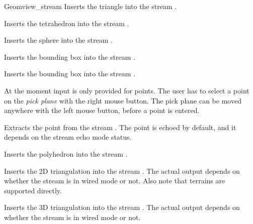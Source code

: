 \begin{ccClass}{Geomview_stream}
{Inserts the triangle  into the stream \ccVar.}


{Inserts the tetrahedron  into the stream \ccVar.}

{Inserts the sphere  into the stream \ccVar.}


{Inserts the bounding box  into the stream \ccVar.}

{Inserts the bounding box  into the stream \ccVar.}



At the moment input is only provided for points. The user has to select
a point on the {\it pick plane} with the right mouse button. The pick plane
can be moved anywhere with the left mouse button, before a point is entered.

{Extracts the point  from the stream \ccVar. The point is
 echoed by default, and it depends on the stream echo mode status.}




{Inserts the polyhedron  into the stream \ccVar.}

{Inserts the 2D triangulation  into the stream \ccVar.
 The actual output depends on whether the stream is in wired mode or not.
 Also note that terrains are supported directly.}

{Inserts the 3D triangulation  into the stream \ccVar.
 The actual output depends on whether the stream is in wired mode or not.}


\end{ccClass}
